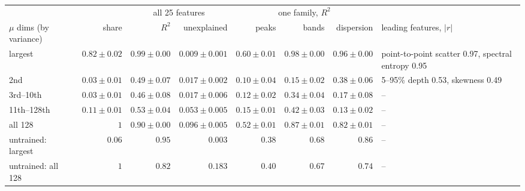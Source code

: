 \setlength{\tabcolsep}{3pt}
\begin{tabular}{lrrrrrrl}
\toprule
 & & \multicolumn{2}{c}{all 25 features} & \multicolumn{3}{c}{one family, $R^2$} & \\
\cmidrule(lr){3-4}\cmidrule(lr){5-7}
$\mu$ dims (by variance) & share & $R^2$ & unexplained & peaks & bands & dispersion & leading features, $|r|$ \\
\midrule
largest & $0.82 \pm 0.02$ & $0.99 \pm 0.00$ & $0.009 \pm 0.001$ & $0.60 \pm 0.01$ & $0.98 \pm 0.00$ & $0.96 \pm 0.00$ & point-to-point scatter 0.97, spectral entropy 0.95 \\
2nd & $0.03 \pm 0.01$ & $0.49 \pm 0.07$ & $0.017 \pm 0.002$ & $0.10 \pm 0.04$ & $0.15 \pm 0.02$ & $0.38 \pm 0.06$ & 5--95\% depth 0.53, skewness 0.49 \\
3rd--10th & $0.03 \pm 0.01$ & $0.46 \pm 0.08$ & $0.017 \pm 0.006$ & $0.12 \pm 0.02$ & $0.34 \pm 0.04$ & $0.17 \pm 0.08$ & -- \\
11th--128th & $0.11 \pm 0.01$ & $0.53 \pm 0.04$ & $0.053 \pm 0.005$ & $0.15 \pm 0.01$ & $0.42 \pm 0.03$ & $0.13 \pm 0.02$ & -- \\
\midrule
all 128 & $1$ & $0.90 \pm 0.00$ & $0.096 \pm 0.005$ & $0.52 \pm 0.01$ & $0.87 \pm 0.01$ & $0.82 \pm 0.01$ & -- \\
\midrule
untrained: largest & $0.06$ & $0.95$ & $0.003$ & $0.38$ & $0.68$ & $0.86$ & -- \\
untrained: all 128 & $1$ & $0.82$ & $0.183$ & $0.40$ & $0.67$ & $0.74$ & -- \\
\bottomrule
\end{tabular}
